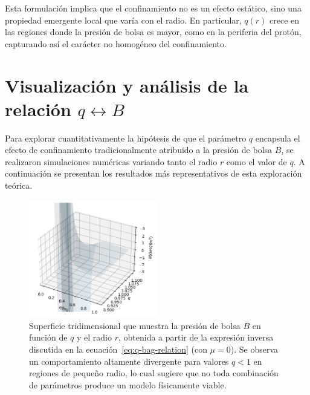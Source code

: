 \begin{remark}
    Esta formulaci\'on implica que el confinamiento no es un efecto est\'atico, sino una propiedad emergente local que var\'ia con el radio. En particular, \( q(r) \) crece en las regiones donde la presi\'on de bolsa es mayor, como en la periferia del prot\'on, capturando as\'i el car\'acter no homog\'eneo del confinamiento.
\end{remark}

\section{Visualización y análisis de la relación \( q \leftrightarrow B \)}

Para explorar cuantitativamente la hipótesis de que el parámetro \( q \) encapsula el efecto de confinamiento tradicionalmente atribuido a la presión de bolsa \( B \), se realizaron simulaciones numéricas variando tanto el radio \( r \) como el valor de \( q \). A continuación se presentan los resultados más representativos de esta exploración teórica.

\begin{figure}[H]
    \centering
    \includegraphics[width=0.5\textwidth]{./Images/B_vs_q_vs_r.png}
    \caption[Superficie \( B(q, r) \)]{Superficie tridimensional que muestra la presión de bolsa \( B \) en función de \( q \) y el radio \( r \), obtenida a partir de la expresión inversa discutida en la ecuación~\eqref{eq:q-bag-relation} (con $\mu = 0$). Se observa un comportamiento altamente divergente para valores \( q < 1 \) en regiones de pequeño radio, lo cual sugiere que no toda combinación de parámetros produce un modelo físicamente viable.}
    \label{fig:B_vs_q_vs_r}
\end{figure}

